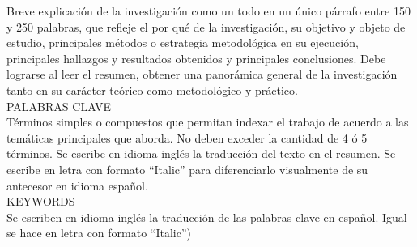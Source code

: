 \ResumenAbstract
{
Breve explicación de la investigación como un todo en un único párrafo entre 150 y 250 palabras, que refleje el por qué de la investigación, su objetivo y objeto de estudio, principales métodos o estrategia metodológica en su ejecución, principales hallazgos y resultados obtenidos y principales conclusiones. Debe lograrse al leer el resumen, obtener una panorámica general de la investigación tanto en su carácter teórico como metodológico y práctico.\\
PALABRAS CLAVE\\
Términos simples o compuestos que permitan indexar el trabajo de acuerdo a las temáticas principales que aborda. No deben exceder la cantidad de 4 ó 5 términos.
}
{
Se escribe en idioma inglés la traducción del texto en el resumen. Se escribe en letra con formato “Italic” para diferenciarlo visualmente de su antecesor en idioma español.\\
KEYWORDS\\
Se escriben en idioma inglés la traducción de las palabras clave en español. Igual se hace en letra con formato “Italic”) 
}
